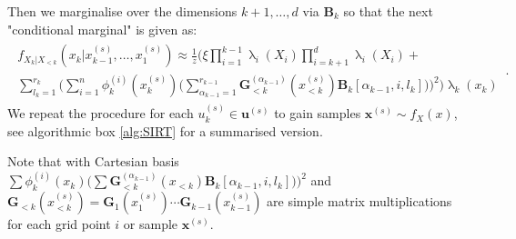 Then we marginalise over the dimensions $k+1 , \dots, d$ via $\bm{B}_k$ so that the next "conditional marginal" is given as:
\begin{align}\begin{split} 
		f_{X_k|X_{<k}}(x_k|x^{(s)}_{k-1},\dots,x^{(s)}_1) \approx \frac{1}{z}
		\Bigg( 
		\xi \prod_{i=1}^{k-1} \uplambda_i(X_i) \prod_{i=k+1}^{d} \uplambda_i(X_i) + \\
		\sum_{l_{k} = 1}^{r_{k}} \Bigg( \sum_{i = 1}^{n}  \phi^{(i)}_k(x^{(s)}_k) \Bigg( \sum_{\alpha_{k-1} = 1}^{r_{k-1}} \bm{G}^{(\alpha_{k-1})}_{<k}(x^{(s)}_{<k}) \bm{B}_k[\alpha_{k-1},i,l_k] \Bigg) \Bigg)^2 \Bigg) \uplambda_k(x_k)
	\end{split} 
	\label{eq:CurrMarg} \, .
\end{align}
We repeat the procedure for each $u^{(s)}_k \in \bm{u}^{(s)}$ to gain samples $\bm{x}^{(s)} \sim f_{X}(x)$, see algorithmic box \ref{alg:SIRT} for a summarised version.



Note that with Cartesian basis $ \sum \phi^{(i)}_k(x_k) \Bigg( \sum \bm{G}^{(\alpha_{k-1})}_{<k}(x_{<k}) \bm{B}_k[\alpha_{k-1},i,l_k] \Bigg) \Bigg)^2 
$  and $\bm{G}_{<k}(x^{(s)}_{<k}) = \bm{G}_{1}(x^{(s)}_{1}) \cdots \bm{G}_{k-1}(x^{(s)}_{k-1}) $ are simple matrix multiplications for each grid point $i$ or sample $\bm{x}^{(s)}$.


